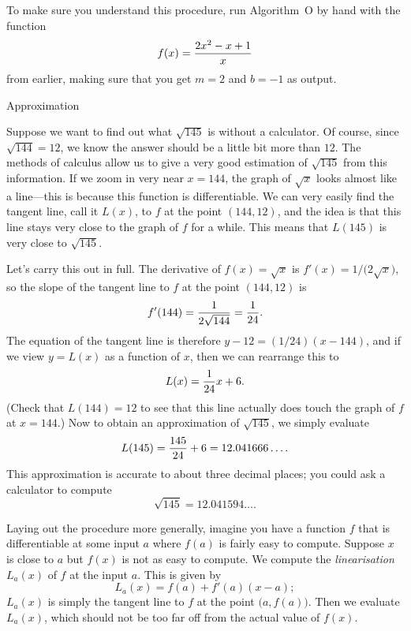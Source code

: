 To make sure you understand this procedure, run Algorithm~O by hand with the function
$$f(x) = {2x^2-x+1\over x}$$
from earlier, making sure that you get $m=2$ and $b=-1$ as output.











\bye

\advsect Approximation

Suppose we want to find out what $\sqrt{145}$ is without a calculator. Of course, since $\sqrt{144} = 12$,
we know the answer should be a little bit more than $12$. The methods of calculus allow us to give a very
good estimation of $\sqrt{145}$ from this information. If we zoom in very near $x=144$,
the graph of $\sqrt x$ looks almost like a line---this is because this function is differentiable. We can very
easily find the tangent line, call it $L(x)$, to $f$ at the point $(144,12)$, and the idea is that this
line stays very close to the graph of $f$ for a while. This means that $L(145)$ is very close to $\sqrt{145}$.

Let's carry this out in full. The derivative of $f(x) = \sqrt x$ is $f'(x) = 1/\bigl(2\sqrt x)$, so
the slope of the tangent line to $f$ at the point $(144,12)$ is
$$f'(144) = {1\over 2\sqrt{144}} = {1\over 24}.$$
The equation of the tangent line is therefore $y-12 = (1/24)(x-144)$, and if we view $y=L(x)$ as a function
of $x$, then we can rearrange this to
$$L(x) = {1\over 24} x + 6.$$
(Check that $L(144) = 12$ to see that this line actually does touch the graph of $f$ at $x=144$.)
Now to obtain an approximation of $\sqrt{145}$, we simply evaluate
$$L(145) = {145\over 24} + 6 = 12.041666\ldots.$$
This approximation is accurate to about three decimal places; you could ask a calculator to compute
$$\sqrt{145} = 12.041594\ldots.$$

Laying out the procedure more generally, imagine you have a function $f$ that is differentiable at some
input $a$ where $f(a)$ is fairly easy to compute. Suppose $x$ is close to $a$ but $f(x)$ is not as easy
to compute. We compute the {\it linearisation} $L_a(x)$ of $f$ at the input $a$. This is given by
$$L_a(x) = f(a) + f'(a) (x-a);$$
$L_a(x)$ is simply the tangent line to $f$ at the point $\bigl(a, f(a)\bigr)$.
Then we evaluate $L_a(x)$, which should not be too far off from the actual value of $f(x)$.





\bye
